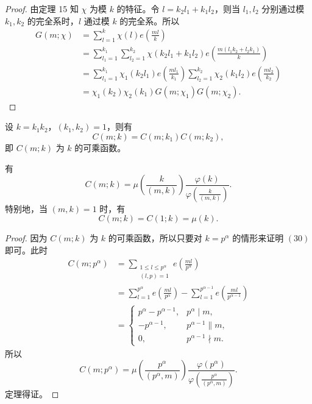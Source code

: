 \begin{proof}
	由定理 15 知 $\chi$ 为模 $k$ 的特征。令 $l=k_2l_1+k_1l_2$，则当 $l_1,l_2$ 分别通过模 $k_1,k_2$ 的完全系时，$l$ 通过模 $k$ 的完全系。所以
	\[
	\begin{aligned}
		G(m;\chi)
		&=
		\sum_{l=1}^{k}\chi(l)e\left(\frac{ml}{k}\right)  \\
		&=
		\sum_{l_1=1}^{k_1}\sum_{l_2=1}^{k_2}
		\chi(k_2l_1+k_1l_2)
		e\left(\frac{m(l_1k_2+l_2k_1)}{k}\right)  \\
		&=
		\sum_{l_1=1}^{k_1}\chi_1(k_2l_1)e\left(\frac{ml_1}{k_1}\right)
		\sum_{l_2=1}^{k_2}\chi_2(k_1l_2)e\left(\frac{ml_2}{k_2}\right)  \\
		&=
		\chi_1(k_2)\chi_2(k_1)G(m;\chi_1)G(m;\chi_2).
	\end{aligned}
	\]
\end{proof}

\begin{corollary}
	设 $k=k_1k_2$，$(k_1,k_2)=1$，则有
	\begin{equation}
		C(m;k)=C(m;k_1)C(m;k_2),
		\tag{29}
	\end{equation}
	即 $C(m;k)$ 为 $k$ 的可乘函数。
\end{corollary}

\begin{theorem}[原文 定理 18]
	有
	\begin{equation}
		C(m;k)=\mu\left(\frac{k}{(m,k)}\right)
		\frac{\varphi(k)}{\varphi\left(\frac{k}{(m,k)}\right)}.
		\tag{30}
	\end{equation}
	特别地，当 $(m,k)=1$ 时，有
	\begin{equation}
		C(m;k)=C(1;k)=\mu(k).
		\tag{31}
	\end{equation}
\end{theorem}

\begin{proof}
	因为 $C(m;k)$ 为 $k$ 的可乘函数，所以只要对 $k=p^\alpha$ 的情形来证明 \((30)\) 即可。此时
	\[
	\begin{aligned}
		C(m;p^\alpha)
		&=
		\sum_{\substack{1\leq l\leq p^\alpha\\ (l,p)=1}}
		e\left(\frac{ml}{p^\alpha}\right)  \\
		&=
		\sum_{l=1}^{p^\alpha}e\left(\frac{ml}{p^\alpha}\right)
		-
		\sum_{l=1}^{p^{\alpha-1}}e\left(\frac{ml}{p^{\alpha-1}}\right)  \\
		&=
		\begin{cases}
			p^\alpha-p^{\alpha-1}, & p^\alpha\mid m,\\
			-p^{\alpha-1}, & p^{\alpha-1}\parallel m,\\
			0, & p^{\alpha-1}\nmid m.
		\end{cases}
	\end{aligned}
	\]
	所以
	\[
		C(m;p^\alpha)=
		\mu\left(\frac{p^\alpha}{(p^\alpha,m)}\right)
		\frac{\varphi(p^\alpha)}
		{\varphi\left(\frac{p^\alpha}{(p^\alpha,m)}\right)}.
	\]
	定理得证。
\end{proof}

